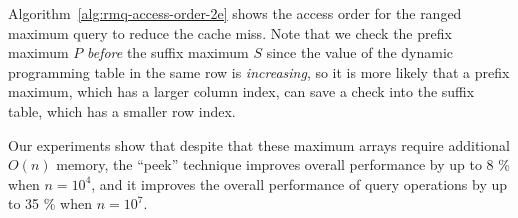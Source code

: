Algorithm~\ref{alg:rmq-access-order-2e} shows the access order for the
ranged maximum query to reduce the cache miss.  Note that we check the
prefix maximum $P$ {\em before} the suffix maximum $S$ since the value
of the dynamic programming table in the same row is {\em increasing},
so it is more likely that a prefix maximum, which has a larger column
index, can save a check into the suffix table, which has a smaller row
index.

Our experiments show that despite that these maximum arrays require
additional $O(n)$ memory, the ``peek'' technique improves overall
performance by up to 8 \% when $n = 10^4$, and it improves the overall
performance of query operations by up to 35 \% when $n = 10^7$.




